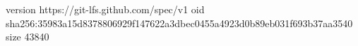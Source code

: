 version https://git-lfs.github.com/spec/v1
oid sha256:35983a15d8378806929f147622a3dbec0455a4923d0b89eb031f693b37aa3540
size 43840
